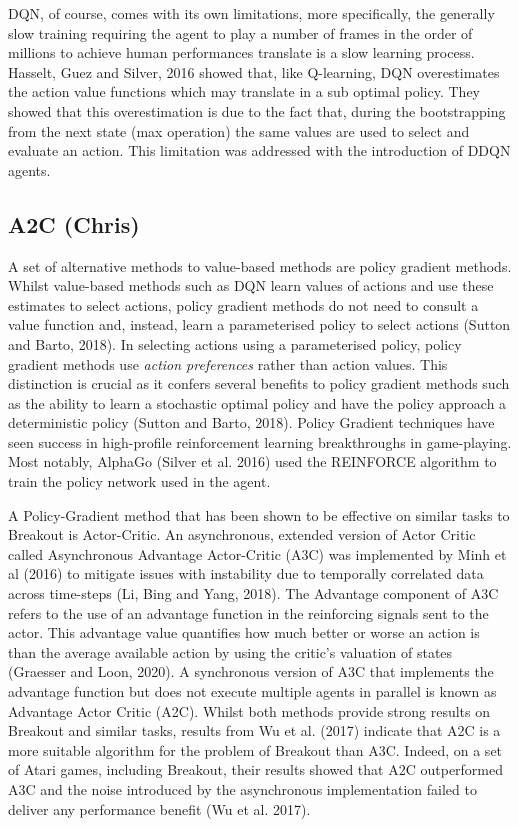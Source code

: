 \documentclass{article}
\begin{document}
DQN, of course, comes with its own limitations, more specifically, the generally slow training requiring the agent to play a number of frames in the order of millions to achieve human performances translate is a slow learning process. Hasselt, Guez and Silver, 2016  showed that, like Q-learning, DQN overestimates the action value functions which may translate in a sub optimal policy. They showed that this overestimation is due to the fact that, during the bootstrapping from the next state (max operation) the same values are used to select and evaluate an action. This limitation was addressed with the introduction of DDQN agents.


\subsection{A2C (Chris)}

A set of alternative methods to value-based methods are policy gradient methods. Whilst value-based methods such as DQN learn values of actions and use these estimates to select actions, policy gradient methods do not need to consult a value function and, instead, learn a parameterised policy to select actions (Sutton and Barto, 2018). In selecting actions using a parameterised policy, policy gradient methods use \emph{action preferences} rather than action values. This distinction is crucial as it confers several benefits to policy gradient methods such as the ability to learn a stochastic optimal policy and have the policy approach a deterministic policy (Sutton and Barto, 2018). Policy Gradient techniques have seen success in high-profile reinforcement learning breakthroughs in game-playing. Most notably, AlphaGo (Silver et al. 2016) used the REINFORCE algorithm to train the policy network used in the agent.

A Policy-Gradient method that has been shown to be effective on similar tasks to Breakout is Actor-Critic. An asynchronous, extended version of Actor Critic called Asynchronous Advantage Actor-Critic (A3C) was implemented by Minh et al (2016) to mitigate issues with instability due to temporally correlated data across time-steps (Li, Bing and Yang, 2018). The Advantage component of A3C refers to the use of an advantage function in the reinforcing signals sent to the actor. This advantage value quantifies how much better or worse an action is than the average available action by using the critic's valuation of states (Graesser and Loon, 2020). A synchronous version of A3C that implements the advantage function but does not execute multiple agents in parallel is known as Advantage Actor Critic (A2C). Whilst both methods provide strong results on Breakout and similar tasks, results from Wu et al. (2017) indicate that A2C is a more suitable algorithm for the problem of Breakout than A3C. Indeed, on a set of Atari games, including Breakout, their results showed that A2C outperformed A3C and the noise introduced by the asynchronous implementation failed to deliver any performance benefit (Wu et al. 2017).
\end{document}
